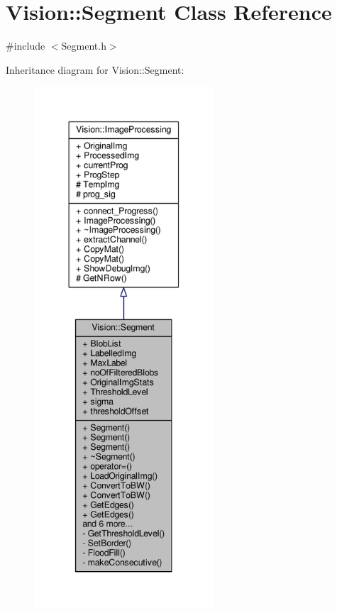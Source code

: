 \hypertarget{class_vision_1_1_segment}{}\section{Vision\+:\+:Segment Class Reference}
\label{class_vision_1_1_segment}


{\ttfamily \#include $<$Segment.\+h$>$}



Inheritance diagram for Vision\+:\+:Segment\+:\nopagebreak
\begin{figure}[H]
\begin{center}
\leavevmode
\includegraphics[height=550pt]{class_vision_1_1_segment__inherit__graph}
\end{center}
\end{figure}


